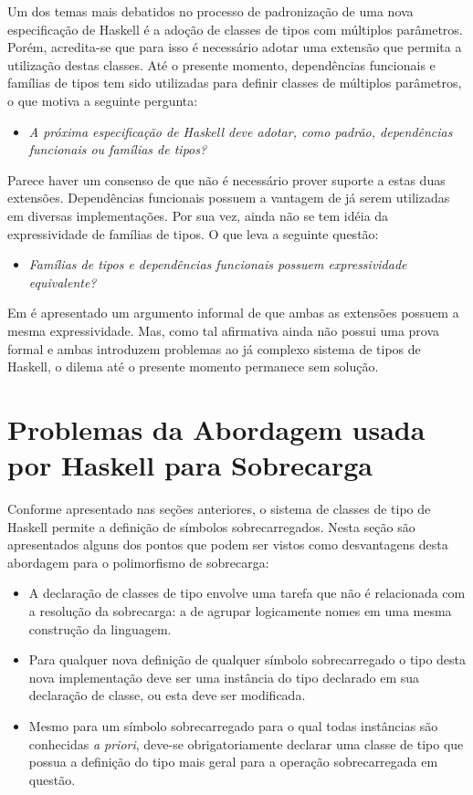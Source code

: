 Um dos temas mais debatidos no processo de padroniza\c{c}\~ao de uma nova especifica\c{c}\~ao de Haskell 
\'e a ado\c{c}\~ao de classes de tipos com m\'ultiplos par\^ametros. Por\'em, acredita-se que para isso 
\'e necess\'ario adotar uma extens\~ao que permita a utiliza\c{c}\~ao destas classes. 
At\'e o presente momento, depend\^encias funcionais e fam\'ilias de tipos tem sido utilizadas para definir classes 
de m\'ultiplos par\^ametros, o que motiva a seguinte pergunta:
\begin{itemize}
	\item[\ ] \emph{A pr\'oxima especifica\c{c}\~ao de Haskell deve adotar, como padr\~ao, depend\^encias funcionais ou
	      fam\'ilias de tipos?}
\end{itemize}
Parece haver um consenso de que n\~ao \'e necess\'ario prover suporte a estas duas extens\~oes. 
Depend\^encias funcionais possuem a vantagem de j\'a serem utilizadas em diversas implementa\c{c}\~oes. 
Por sua vez, ainda n\~ao se tem id\'eia da expressividade de fam\'ilias de tipos. O que leva a seguinte quest\~ao:
\begin{itemize}
	\item[\ ] \emph{Fam\'ilias de tipos e depend\^encias funcionais possuem expressividade equivalente?}
\end{itemize} 
Em \cite{Chakravarty05a} \'e apresentado um argumento informal de que ambas as extens\~oes possuem a mesma
expressividade. Mas, como tal afirmativa ainda n\~ao possui uma prova formal e ambas introduzem problemas ao j\'a
complexo sistema de tipos de Haskell, o dilema at\'e o presente momento permanece sem solu\c{c}\~ao. 


\section{Problemas da Abordagem usada por Haskell para Sobrecarga}

Conforme apresentado nas se\c{c}\~oes anteriores, o sistema de classes de tipo de Haskell permite 
a defini\c{c}\~ao de s\'imbolos sobrecarregados. Nesta se\c{c}\~ao s\~ao apresentados alguns dos pontos 
que podem ser vistos como desvantagens desta abordagem para o polimorfismo de sobrecarga:

\begin{itemize}
    \item{A declara\c{c}\~ao de classes de tipo envolve uma tarefa que n\~ao \'e relacionada com a
          resolu\c{c}\~ao da sobrecarga: a de agrupar logicamente nomes em uma mesma constru\c{c}\~ao da
          linguagem. }
    \item{Para qualquer nova defini\c{c}\~ao de qualquer s\'imbolo sobrecarregado o tipo desta nova
          implementa\c{c}\~ao deve ser uma inst\^ancia do tipo declarado em sua declara\c{c}\~ao de classe,
          ou esta deve ser modificada.}    
    \item Mesmo para um s\'imbolo sobrecarregado para o qual todas inst\^ancias s\~ao conhecidas \emph{a priori}, 
          deve-se
          obrigatoriamente declarar uma classe de tipo que possua a defini\c{c}\~ao do tipo mais geral para 
          a opera\c{c}\~ao sobrecarregada em quest\~ao.
\end{itemize}

